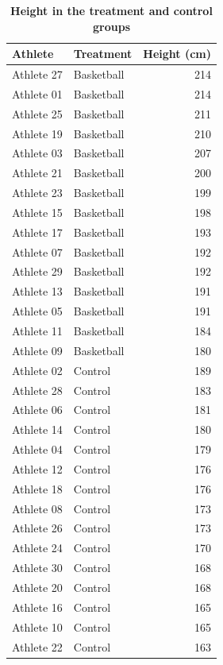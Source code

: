\documentclass[
]{book}
\begin{document}
\begin{table}

\caption{\label{tab:basketball-data}\textbf{Height in the treatment and control groups}}
\centering
\begin{tabular}[t]{llr}
\toprule
Athlete & Treatment & Height (cm)\\
\midrule
Athlete 27 & Basketball & 214\\
Athlete 01 & Basketball & 214\\
Athlete 25 & Basketball & 211\\
Athlete 19 & Basketball & 210\\
Athlete 03 & Basketball & 207\\
\addlinespace
Athlete 21 & Basketball & 200\\
Athlete 23 & Basketball & 199\\
Athlete 15 & Basketball & 198\\
Athlete 17 & Basketball & 193\\
Athlete 07 & Basketball & 192\\
\addlinespace
Athlete 29 & Basketball & 192\\
Athlete 13 & Basketball & 191\\
Athlete 05 & Basketball & 191\\
Athlete 11 & Basketball & 184\\
Athlete 09 & Basketball & 180\\
\addlinespace
Athlete 02 & Control & 189\\
Athlete 28 & Control & 183\\
Athlete 06 & Control & 181\\
Athlete 14 & Control & 180\\
Athlete 04 & Control & 179\\
\addlinespace
Athlete 12 & Control & 176\\
Athlete 18 & Control & 176\\
Athlete 08 & Control & 173\\
Athlete 26 & Control & 173\\
Athlete 24 & Control & 170\\
\addlinespace
Athlete 30 & Control & 168\\
Athlete 20 & Control & 168\\
Athlete 16 & Control & 165\\
Athlete 10 & Control & 165\\
Athlete 22 & Control & 163\\
\bottomrule
\end{tabular}
\end{table}
\end{document}
